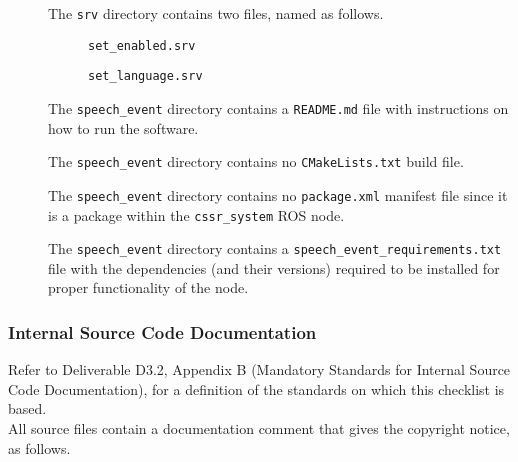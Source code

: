 \documentclass{CSSRforAfrica}
\newcommand{\checkboxChecked}{\fbox{\ding{51}}} %
\begin{document}
\begin{description}
\item[\checkboxChecked] The  {\small \verb+srv+} directory contains two files, named as follows.
\begin{description}
\item[\checkboxChecked] {\small \verb+set_enabled.srv+}  
\item[\checkboxChecked] {\small \verb+set_language.srv+}  
\end{description} 

\item[\checkboxChecked] The {\small \verb+speech_event+} directory contains  a {\small \verb+README.md+} file with  instructions on how to run the software. 

\item[\checkboxChecked] The {\small \verb+speech_event+} directory contains  no {\small \verb+CMakeLists.txt+} build file. 

\item[\checkboxChecked] The {\small \verb+speech_event+} directory contains  no {\small \verb+package.xml+} manifest file since it is a package within the {\small \verb+cssr_system+} ROS node.

\item[\checkboxChecked] The {\small \verb+speech_event+} directory contains a {\small \verb+speech_event_requirements.txt+} file with the dependencies (and their versions) required to be installed for proper functionality of the node.

\end{description}


 
 \newpage
\subsubsection{Internal Source Code Documentation}
\label{subsubsection:speech_event_documentation_standards}  
 
Refer to Deliverable D3.2, Appendix B (Mandatory Standards for Internal Source Code Documentation), for a definition of the standards on which this checklist is based.\\

\noindent All source files contain a documentation comment that gives the copyright notice, as follows.
 
\end{document}
